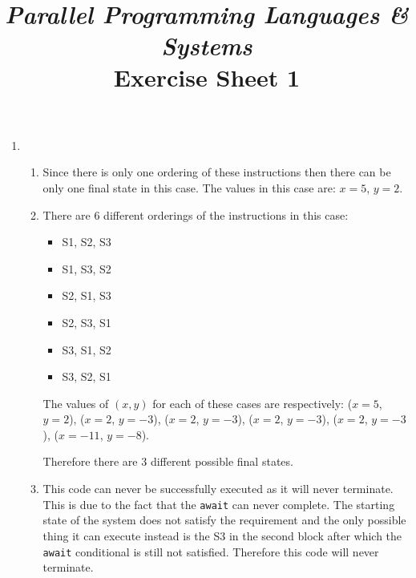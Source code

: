 \documentclass[12pt, a4paper]{article}
\title{\normalsize{\textit{Parallel Programming Languages \& Systems}} \\ \Huge Exercise Sheet 1}
\author{\theauthor}
\begin{document}
\maketitle
\thispagestyle{empty}

\begin{enumerate}

    \item

        \begin{enumerate}

            \item

                Since there is only one ordering of these instructions then there can
                be only one final state in this case. The values in this case are:
                $x=5$, $y=2$.

            \item

                There are 6 different orderings of the instructions in this case:

                \begin{itemize}

                    \item S1, S2, S3
                    \item S1, S3, S2
                    \item S2, S1, S3
                    \item S2, S3, S1
                    \item S3, S1, S2
                    \item S3, S2, S1

                \end{itemize}

				The values of $(x,y)$ for each of these cases are respectively:
				($x=5$, $y=2$), ($x=2$, $y=-3$), ($x=2$, $y=-3$), ($x=2$,
				$y=-3$), ($x=2$, $y=-3$), ($x=-11$, $y=-8$).

                Therefore there are 3 different possible final states.

            \item

				This code can never be successfully executed as it will never
				terminate. This is due to the fact that the \texttt{await} can
				never complete. The starting state of the system does not
				satisfy the requirement and the only possible thing it can
				execute instead is the S3 in the second block after which the
				\texttt{await} conditional is still not satisfied. Therefore
				this code will never terminate.


\end{enumerate}
\end{enumerate}
\end{document}
